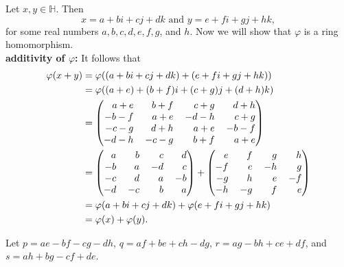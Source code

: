 \begin{enumerate}
      Let $x, y \in \mathbb{H}$. Then
      $$x = a + bi + cj + dk \text{ and } y = e + fi + gj + hk,$$
      for some real numbers $a, b, c, d, e, f, g$, and $h$. Now we will show
      that $\varphi$ is a ring homomorphism. \\

      \textbf{additivity of $\varphi$:} It follows that
      \begin{align*}
         \varphi(x + y) &= \varphi((a + bi + cj + dk) + (e + fi + gj + hk)) \\
            &= \varphi((a + e) + (b + f)i + (c + g)j + (d + h)k) \\
            &= \left(\begin{tabular}{@{}rrrr@{}}
               $a + e$  & $b + f$  & $c + g$  & $d + h$ \\
               $-b - f$ & $a + e$  & $-d - h$ & $c + g$ \\
               $-c - g$ & $d + h$  & $a + e$  & $-b - f$ \\
               $-d - h$ & $-c - g$ & $b + f$  & $a + e$
            \end{tabular}\right) \\
            &= \left(\begin{tabular}{@{}rrrr@{}}
               $a$  & $b$  & $c$  & $d$ \\
               $-b$ & $a$  & $-d$ & $c$ \\
               $-c$ & $d$  & $a$  & $-b$ \\
               $-d$ & $-c$ & $b$  & $a$
            \end{tabular}\right) + \left(\begin{tabular}{@{}rrrr@{}}
               $e$  & $f$  & $g$  & $h$ \\
               $-f$ & $e$  & $-h$ & $g$ \\
               $-g$ & $h$  & $e$  & $-f$ \\
               $-h$ & $-g$ & $f$  & $e$
            \end{tabular}\right) \\
            &= \varphi(a + bi + cj + dk) + \varphi(e + fi + gj + hk) \\
            &= \varphi(x) + \varphi(y).
      \end{align*}

      Let $p = ae - bf - cg - dh$, $q = af + be + ch - dg$,
      $r = ag - bh + ce + df$, and $s = ah + bg - cf + de$.


\end{enumerate}
